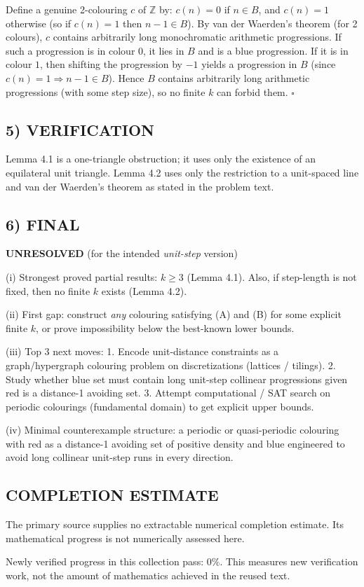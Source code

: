 Define a genuine 2-colouring $c$ of $\mathbb{Z}$ by: $c(n)=0$ if $n\in B$, and $c(n)=1$ otherwise (so if $c(n)=1$ then $n-1\in B$).
By van der Waerden’s theorem (for 2 colours), $c$ contains arbitrarily long monochromatic arithmetic progressions.
If such a progression is in colour $0$, it lies in $B$ and is a blue progression.
If it is in colour $1$, then shifting the progression by $-1$ yields a progression in $B$ (since $c(n)=1\Rightarrow n-1\in B$).
Hence $B$ contains arbitrarily long arithmetic progressions (with some step size), so no finite $k$ can forbid them. \hfill$\square$

\subsection*{5) VERIFICATION}
Lemma 4.1 is a one-triangle obstruction; it uses only the existence of an equilateral unit triangle.
Lemma 4.2 uses only the restriction to a unit-spaced line and van der Waerden’s theorem as stated in the problem text.

\subsection*{6) FINAL}
\textbf{UNRESOLVED} (for the intended \emph{unit-step} version)

(i) Strongest proved partial results: $k\ge 3$ (Lemma 4.1). Also, if step-length is not fixed, then no finite $k$ exists (Lemma 4.2).

(ii) First gap: construct \emph{any} colouring satisfying (A) and (B) for some explicit finite $k$, or prove impossibility below the best-known lower bounds.

(iii) Top 3 next moves:
1. Encode unit-distance constraints as a graph/hypergraph colouring problem on discretizations (lattices / tilings).
2. Study whether blue set must contain long unit-step collinear progressions given red is a distance-1 avoiding set.
3. Attempt computational / SAT search on periodic colourings (fundamental domain) to get explicit upper bounds.

(iv) Minimal counterexample structure: a periodic or quasi-periodic colouring with red as a distance-1 avoiding set of positive density and blue
engineered to avoid long collinear unit-step runs in every direction.



\subsection*{COMPLETION ESTIMATE}
The primary source supplies no extractable numerical completion estimate. Its mathematical progress is not numerically assessed here.

Newly verified progress in this collection pass: $0\%$. This measures new verification work, not the amount of mathematics achieved in the reused text.
